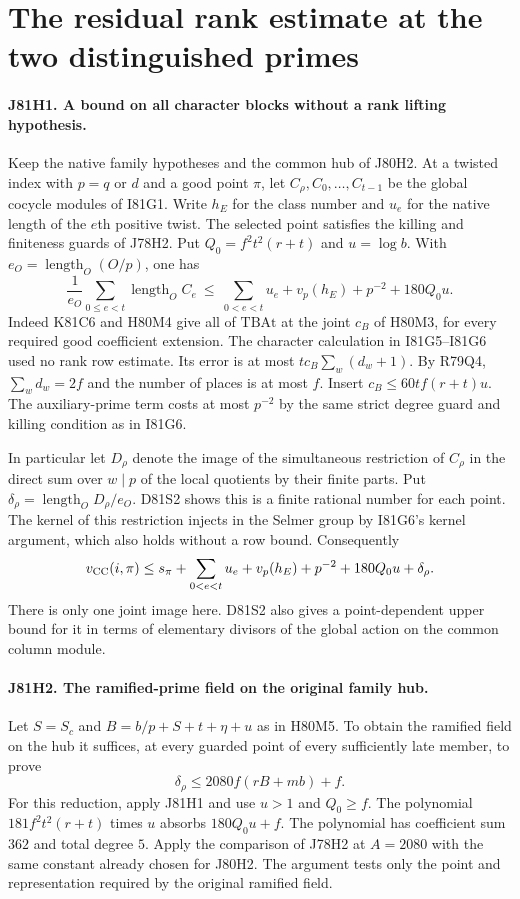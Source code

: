 \section{The residual rank estimate at the two distinguished primes}

\paragraph{J81H1. A bound on all character blocks without a rank lifting hypothesis.}
Keep the native family hypotheses and the common hub of J80H2.
At a twisted index with $p=q$ or $d$ and a good point $\pi$,
let $C_\rho,C_0,\ldots,C_{t-1}$ be the global cocycle modules
of I81G1. Write $h_E$ for the class number and $u_e$ for the
native length of the $e$th positive twist.
The selected point satisfies the killing and finiteness guards of
J78H2. Put $Q_0=f^2t^2(r+t)$ and $u=\log b$.
With $e_O=\operatorname{length}_O(O/p)$, one has
\[
 \frac{1}{e_O}\sum_{0\le e<t}\operatorname{length}_O C_e
 \ \le\ \sum_{0<e<t}u_e+v_p(h_E)+p^{-2}+180Q_0u .
\]
Indeed K81C6 and H80M4 give all of $\mathrm{TBAt}$ at the joint
$c_B$ of H80M3, for every required good coefficient extension.
The character calculation in I81G5--I81G6 used no rank row estimate.
Its error is at most $t c_B\sum_w(d_w+1)$. By R79Q4,
$\sum_w d_w=2f$ and the number of places is at most $f$.
Insert $c_B\le60tf(r+t)u$. The auxiliary-prime term costs at
most $p^{-2}$ by the same strict degree guard and killing condition
as in I81G6.

In particular let $D_\rho$ denote the image of the simultaneous
restriction of $C_\rho$ in
the direct sum over $w\mid p$ of the local quotients by their
finite parts. Put $\delta_\rho=\operatorname{length}_O D_\rho/e_O$.
D81S2 shows this is a finite rational number for each point.
The kernel of this restriction injects in the Selmer group by
I81G6's kernel argument, which also holds without a row bound.
Consequently
\[
 v_{\rm CC}(i,\pi)\le s_\pi+\sum_{0<e<t}u_e+v_p(h_E)
                 +p^{-2}+180Q_0u+\delta_\rho.
\]
There is only one joint image here. D81S2 also gives a
point-dependent upper bound for it in terms of elementary divisors
of the global action on the common column module.

\paragraph{J81H2. The ramified-prime field on the original family hub.}
Let $S=S_c$ and $B=b/p+S+t+\eta+u$ as in H80M5. To obtain the
ramified field on the hub it suffices, at every guarded point of
every sufficiently late member, to prove
\[
                 \delta_\rho\le2080 f(rB+mb)+f .
\]
For this reduction, apply J81H1 and use $u>1$ and $Q_0\ge f$. The polynomial
$181 f^2t^2(r+t)$ times $u$ absorbs $180Q_0u+f$. The polynomial
has coefficient sum $362$ and total degree $5$. Apply the comparison
of J78H2 at $A=2080$ with the same constant already chosen for J80H2.
The argument tests only the point and representation required by the
original ramified field.

